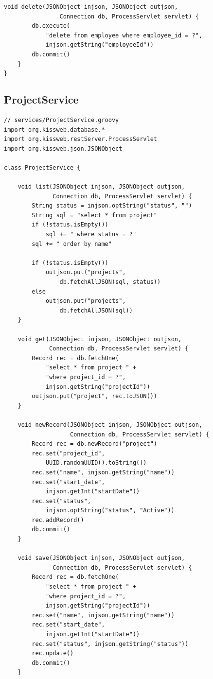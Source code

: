 \begin{lstlisting}[style=groovy]
    void delete(JSONObject injson, JSONObject outjson,
                Connection db, ProcessServlet servlet) {
        db.execute(
            "delete from employee where employee_id = ?",
            injson.getString("employeeId"))
        db.commit()
    }
}
\end{lstlisting}

\subsection{ProjectService}

\begin{lstlisting}[style=groovy]
// services/ProjectService.groovy
import org.kissweb.database.*
import org.kissweb.restServer.ProcessServlet
import org.kissweb.json.JSONObject

class ProjectService {

    void list(JSONObject injson, JSONObject outjson,
              Connection db, ProcessServlet servlet) {
        String status = injson.optString("status", "")
        String sql = "select * from project"
        if (!status.isEmpty())
            sql += " where status = ?"
        sql += " order by name"

        if (!status.isEmpty())
            outjson.put("projects",
                db.fetchAllJSON(sql, status))
        else
            outjson.put("projects",
                db.fetchAllJSON(sql))
    }

    void get(JSONObject injson, JSONObject outjson,
             Connection db, ProcessServlet servlet) {
        Record rec = db.fetchOne(
            "select * from project " +
            "where project_id = ?",
            injson.getString("projectId"))
        outjson.put("project", rec.toJSON())
    }

    void newRecord(JSONObject injson, JSONObject outjson,
                   Connection db, ProcessServlet servlet) {
        Record rec = db.newRecord("project")
        rec.set("project_id",
            UUID.randomUUID().toString())
        rec.set("name", injson.getString("name"))
        rec.set("start_date",
            injson.getInt("startDate"))
        rec.set("status",
            injson.optString("status", "Active"))
        rec.addRecord()
        db.commit()
    }

    void save(JSONObject injson, JSONObject outjson,
              Connection db, ProcessServlet servlet) {
        Record rec = db.fetchOne(
            "select * from project " +
            "where project_id = ?",
            injson.getString("projectId"))
        rec.set("name", injson.getString("name"))
        rec.set("start_date",
            injson.getInt("startDate"))
        rec.set("status", injson.getString("status"))
        rec.update()
        db.commit()
    }


\end{lstlisting}
